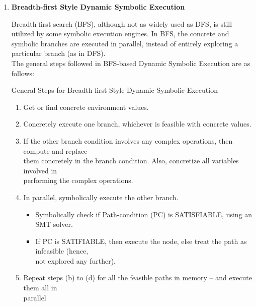 \documentclass[11pt]{llncs}
\begin{document}
\begin{enumerate}
				\vspace{8mm}

				
				\item \textbf{Breadth-first Style Dynamic Symbolic Execution} 
				\vspace{1mm}

				Breadth first search (BFS), although not as widely used as DFS, is still utilized by some symbolic execution engines. In BFS, the concrete and symbolic branches are executed in parallel, instead of entirely exploring a particular branch (as in DFS).\cite{1_Search_Strategies_DSE}\\

				The general steps followed in BFS-based Dynamic Symbolic Execution are as follows:\\
				
				\vspace{-3mm}

				\begin{algorithm}[H]
					\caption{General Steps for Breadth-first Style Dynamic Symbolic Execution}  \label{algorithm_3}
					
					\DontPrintSemicolon
					\SetAlgoLined
					
					
					\vspace{2mm}

					\begin{enumerate}
						\item Get or find concrete environment values.
						\item Concretely execute one branch, whichever is feasible with concrete values.
						\item If the other branch condition involves any complex operations, then compute and replace \\them concretely in the branch condition. Also, concretize all variables involved in\\ performing the complex operations.
						\item In parallel, symbolically execute the other branch.
							\begin{itemize}
								\item Symbolically check if Path-condition (PC) is SATISFIABLE, using an SMT solver.
								\item If PC is SATIFIABLE, then execute the node, else treat the path as infeasible (hence,\\ not explored any further).
							\end{itemize}
						\item Repeat steps (b) to (d) for all the feasible paths in memory – and execute them all in\\parallel
					\end{enumerate}
				\end{algorithm}
				~


\end{enumerate}
\end{document}
